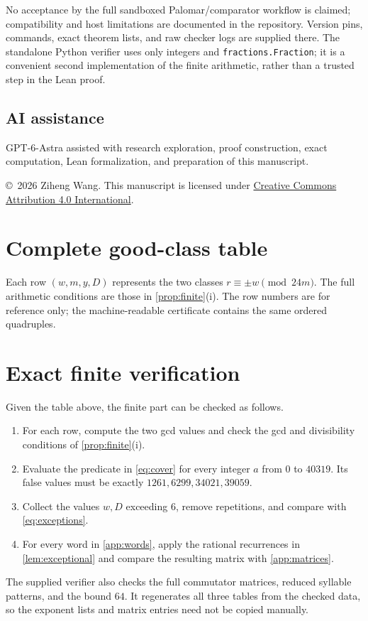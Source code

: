 \documentclass[11pt]{article}
\theoremstyle{definition}
\theoremstyle{remark}
\numberwithin{equation}{section}
\begin{document}
No acceptance by the full sandboxed Palomar/comparator workflow is
claimed; compatibility and host limitations are documented in the
repository. Version pins, commands, exact theorem lists, and raw
checker logs are supplied there. The standalone Python verifier
uses only integers and \texttt{fractions.Fraction}; it is a convenient
second implementation of the finite arithmetic, rather than a
trusted step in the Lean proof.

\subsection*{AI assistance}
GPT-6-Astra assisted with research exploration, proof construction,
exact computation, Lean formalization, and preparation of this manuscript.

\smallskip
\noindent\copyright\ 2026 Ziheng Wang. This manuscript is licensed under
\href{https://creativecommons.org/licenses/by/4.0/}{Creative Commons Attribution 4.0 International}.

\appendix
{}
\clearpage
\section{Complete good-class table}\label{app:rules}
Each row $(w,m,y,D)$ represents the two classes
$r\equiv\pm w\pmod{24m}$. The full arithmetic conditions are
those in \cref{prop:finite}(i). The row numbers are for reference
only; the machine-readable certificate contains the same ordered
quadruples.


\section{Exact finite verification}\label{app:verification}
Given the table above, the finite part can be checked as follows.
\begin{enumerate}
\item For each row, compute the two gcd values and check the
gcd and divisibility conditions of \cref{prop:finite}(i).
\item Evaluate the predicate in \eqref{eq:cover} for every integer
$a$ from $0$ to $40319$. Its false values must be exactly
$1261,6299,34021,39059$.
\item Collect the values $w,D$ exceeding $6$, remove repetitions,
and compare with \eqref{eq:exceptions}.
\item For every word in \cref{app:words}, apply the rational
recurrences in \cref{lem:exceptional} and compare the resulting
matrix with \cref{app:matrices}.
\end{enumerate}
The supplied verifier also checks the full commutator matrices,
reduced syllable patterns, and the bound $64$. It regenerates all
three tables from the checked data, so the exponent lists and
matrix entries need not be copied manually.
\end{document}

